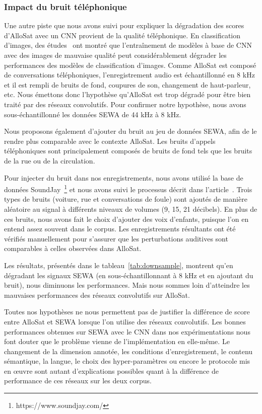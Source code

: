 \subsubsection{Impact du bruit téléphonique}
Une autre piste que nous avons suivi pour expliquer la dégradation des scores d'AlloSat avec un CNN provient de la qualité téléphonique.
En classification d'images, des études~\cite{Roy2018,Dodge2016} ont montré que l'entraînement de modèles à base de CNN avec des images de mauvaise qualité peut considérablement dégrader les performances des modèles de classification d'images.
Comme AlloSat est composé de conversations téléphoniques, l'enregistrement audio est échantillonné en 8 kHz et il est rempli de bruits de fond, coupures de son, changement de haut-parleur, etc. Nous émettons donc l'hypothèse qu'AlloSat est trop dégradé pour être bien traité par des réseaux convolutifs.
Pour confirmer notre hypothèse, nous avons sous-échantillonné les données SEWA de 44 kHz à 8 kHz.

Nous proposons également d'ajouter du bruit au jeu de données SEWA, afin de le rendre plus comparable avec le contexte AlloSat. Les bruits d'appels téléphoniques sont principalement composés de bruits de fond tels que les bruits de la rue ou de la circulation.

Pour injecter du bruit dans nos enregistrements, nous avons utilisé la base de données SoundJay~\footnote{https://www.soundjay.com/} et nous avons suivi le processus décrit dans l'article~\cite{Alzqhoul2016}. Trois types de bruits (voiture, rue et conversations de foule) sont ajoutés de manière aléatoire au signal à différents niveaux de volumes (9, 15, 21 décibels). En plus de ces bruits, nous avons fait le choix d'ajouter des voix d'enfants, puisque l'on en entend assez souvent dans le corpus. Les enregistrements résultants ont été vérifiés manuellement pour s'assurer que les perturbations auditives sont comparables à celles observées dans AlloSat.



Les résultats, présentés dans le tableau~\ref{tab:downsample}, montrent qu'en dégradant les signaux SEWA (en sous-échantillonnant à 8 kHz et en ajoutant du bruit), nous diminuons les performances. Mais nous sommes loin d'atteindre les mauvaises performances des réseaux convolutifs sur AlloSat.

Toutes nos hypothèses ne nous permettent pas de justifier la différence de score entre AlloSat et SEWA lorsque l'on utilise des réseaux convolutifs. Les bonnes performances obtenues sur SEWA avec le CNN dans nos expérimentations nous font douter que le problème vienne de l'implémentation en elle-même. Le changement de la dimension annotée, les conditions d'enregistrement, le contenu sémantique, la langue, le choix des hyper-paramètres ou encore le protocole mis en \oe uvre sont autant d'explications possibles quant à la différence de performance de ces réseaux sur les deux corpus.

